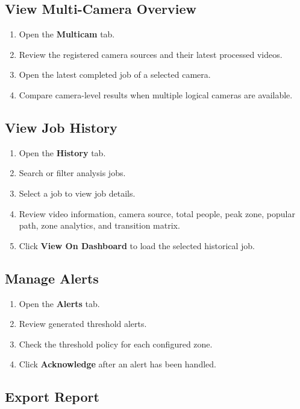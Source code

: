 \documentclass[12pt,a4paper]{report}
\begin{document}
\subsection{View Multi-Camera Overview}

\begin{enumerate}
    \item Open the \textbf{Multicam} tab.
    \item Review the registered camera sources and their latest processed videos.
    \item Open the latest completed job of a selected camera.
    \item Compare camera-level results when multiple logical cameras are available.
\end{enumerate}

\subsection{View Job History}

\begin{enumerate}
    \item Open the \textbf{History} tab.
    \item Search or filter analysis jobs.
    \item Select a job to view job details.
    \item Review video information, camera source, total people, peak zone, popular path, zone analytics, and transition matrix.
    \item Click \textbf{View On Dashboard} to load the selected historical job.
\end{enumerate}

\subsection{Manage Alerts}

\begin{enumerate}
    \item Open the \textbf{Alerts} tab.
    \item Review generated threshold alerts.
    \item Check the threshold policy for each configured zone.
    \item Click \textbf{Acknowledge} after an alert has been handled.
\end{enumerate}

\subsection{Export Report}
\end{document}

